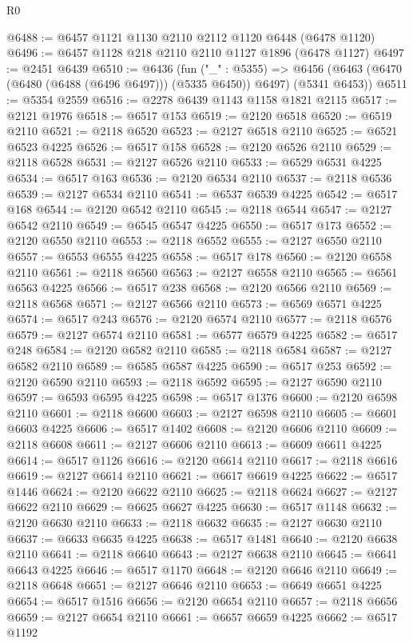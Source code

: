 \begin{lexlean}{R0}
\begin{coremodule}
@6488 := @6457 @1121 @1130 @2110 @2112 @1120 @6448 (@6478 @1120)
@6496 := @6457 @1128 @218 @2110 @2110 @1127 @1896 (@6478 @1127)
@6497 := @2451 @6439
@6510 := @6436
    (fun ("_" : @5355) =>
    @6456 (@6463 (@6470 (@6480 (@6488 (@6496 @6497))) (@5335 @6450)) @6497) (@5341 @6453))
@6511 := @5354 @2559
@6516 := @2278 @6439 @1143 @1158 @1821 @2115
@6517 := @2121 @1976
@6518 := @6517 @153
@6519 := @2120 @6518
@6520 := @6519 @2110
@6521 := @2118 @6520
@6523 := @2127 @6518 @2110
@6525 := @6521 @6523 @4225
@6526 := @6517 @158
@6528 := @2120 @6526 @2110
@6529 := @2118 @6528
@6531 := @2127 @6526 @2110
@6533 := @6529 @6531 @4225
@6534 := @6517 @163
@6536 := @2120 @6534 @2110
@6537 := @2118 @6536
@6539 := @2127 @6534 @2110
@6541 := @6537 @6539 @4225
@6542 := @6517 @168
@6544 := @2120 @6542 @2110
@6545 := @2118 @6544
@6547 := @2127 @6542 @2110
@6549 := @6545 @6547 @4225
@6550 := @6517 @173
@6552 := @2120 @6550 @2110
@6553 := @2118 @6552
@6555 := @2127 @6550 @2110
@6557 := @6553 @6555 @4225
@6558 := @6517 @178
@6560 := @2120 @6558 @2110
@6561 := @2118 @6560
@6563 := @2127 @6558 @2110
@6565 := @6561 @6563 @4225
@6566 := @6517 @238
@6568 := @2120 @6566 @2110
@6569 := @2118 @6568
@6571 := @2127 @6566 @2110
@6573 := @6569 @6571 @4225
@6574 := @6517 @243
@6576 := @2120 @6574 @2110
@6577 := @2118 @6576
@6579 := @2127 @6574 @2110
@6581 := @6577 @6579 @4225
@6582 := @6517 @248
@6584 := @2120 @6582 @2110
@6585 := @2118 @6584
@6587 := @2127 @6582 @2110
@6589 := @6585 @6587 @4225
@6590 := @6517 @253
@6592 := @2120 @6590 @2110
@6593 := @2118 @6592
@6595 := @2127 @6590 @2110
@6597 := @6593 @6595 @4225
@6598 := @6517 @1376
@6600 := @2120 @6598 @2110
@6601 := @2118 @6600
@6603 := @2127 @6598 @2110
@6605 := @6601 @6603 @4225
@6606 := @6517 @1402
@6608 := @2120 @6606 @2110
@6609 := @2118 @6608
@6611 := @2127 @6606 @2110
@6613 := @6609 @6611 @4225
@6614 := @6517 @1126
@6616 := @2120 @6614 @2110
@6617 := @2118 @6616
@6619 := @2127 @6614 @2110
@6621 := @6617 @6619 @4225
@6622 := @6517 @1446
@6624 := @2120 @6622 @2110
@6625 := @2118 @6624
@6627 := @2127 @6622 @2110
@6629 := @6625 @6627 @4225
@6630 := @6517 @1148
@6632 := @2120 @6630 @2110
@6633 := @2118 @6632
@6635 := @2127 @6630 @2110
@6637 := @6633 @6635 @4225
@6638 := @6517 @1481
@6640 := @2120 @6638 @2110
@6641 := @2118 @6640
@6643 := @2127 @6638 @2110
@6645 := @6641 @6643 @4225
@6646 := @6517 @1170
@6648 := @2120 @6646 @2110
@6649 := @2118 @6648
@6651 := @2127 @6646 @2110
@6653 := @6649 @6651 @4225
@6654 := @6517 @1516
@6656 := @2120 @6654 @2110
@6657 := @2118 @6656
@6659 := @2127 @6654 @2110
@6661 := @6657 @6659 @4225
@6662 := @6517 @1192

\end{coremodule}
\end{lexlean}
